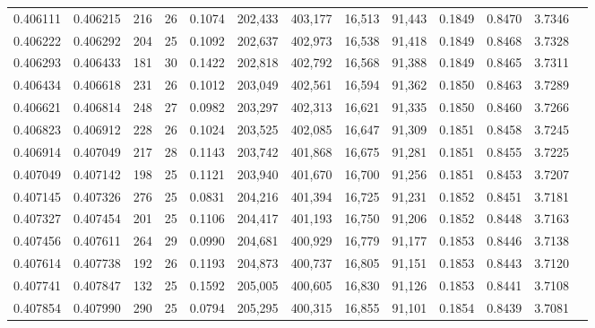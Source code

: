 \begin{tabular}{rrrrrrrrrrrrr}
0.406111 & 0.406215 & 216 &  26 &                                     0.1074 & 202,433 & 403,177 &  16,513 &  91,443 & 0.1849 & 0.8470 & 3.7346 \\
0.406222 & 0.406292 & 204 &  25 &                                     0.1092 & 202,637 & 402,973 &  16,538 &  91,418 & 0.1849 & 0.8468 & 3.7328 \\
0.406293 & 0.406433 & 181 &  30 &                                     0.1422 & 202,818 & 402,792 &  16,568 &  91,388 & 0.1849 & 0.8465 & 3.7311 \\
0.406434 & 0.406618 & 231 &  26 &                                     0.1012 & 203,049 & 402,561 &  16,594 &  91,362 & 0.1850 & 0.8463 & 3.7289 \\
0.406621 & 0.406814 & 248 &  27 &                                     0.0982 & 203,297 & 402,313 &  16,621 &  91,335 & 0.1850 & 0.8460 & 3.7266 \\
0.406823 & 0.406912 & 228 &  26 &                                     0.1024 & 203,525 & 402,085 &  16,647 &  91,309 & 0.1851 & 0.8458 & 3.7245 \\
0.406914 & 0.407049 & 217 &  28 &                                     0.1143 & 203,742 & 401,868 &  16,675 &  91,281 & 0.1851 & 0.8455 & 3.7225 \\
0.407049 & 0.407142 & 198 &  25 &                                     0.1121 & 203,940 & 401,670 &  16,700 &  91,256 & 0.1851 & 0.8453 & 3.7207 \\
0.407145 & 0.407326 & 276 &  25 &                                     0.0831 & 204,216 & 401,394 &  16,725 &  91,231 & 0.1852 & 0.8451 & 3.7181 \\
0.407327 & 0.407454 & 201 &  25 &                                     0.1106 & 204,417 & 401,193 &  16,750 &  91,206 & 0.1852 & 0.8448 & 3.7163 \\
0.407456 & 0.407611 & 264 &  29 &                                     0.0990 & 204,681 & 400,929 &  16,779 &  91,177 & 0.1853 & 0.8446 & 3.7138 \\
0.407614 & 0.407738 & 192 &  26 &                                     0.1193 & 204,873 & 400,737 &  16,805 &  91,151 & 0.1853 & 0.8443 & 3.7120 \\
0.407741 & 0.407847 & 132 &  25 &                                     0.1592 & 205,005 & 400,605 &  16,830 &  91,126 & 0.1853 & 0.8441 & 3.7108 \\
0.407854 & 0.407990 & 290 &  25 &                                     0.0794 & 205,295 & 400,315 &  16,855 &  91,101 & 0.1854 & 0.8439 & 3.7081 \\

\end{tabular}
